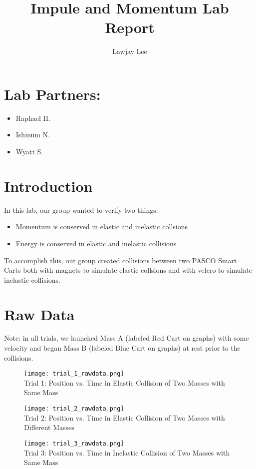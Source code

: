 \documentclass[fleqn]{article}
\title{Impule and Momentum Lab Report}
\author{Lawjay Lee}
\date{}
\begin{document}
\maketitle

\section*{Lab Partners:}
\begin{itemize}
	\item Raphael H.
	\item Ishmum N.
	\item Wyatt S.
\end{itemize}

\section*{Introduction}
In this lab, our group wanted to verify two things:
\begin{itemize}
	\item Momentum is conserved in elastic and inelastic collsions
	\item Energy is conserved in elastic and inelastic collisions
\end{itemize}

To accomplish this, our group created collisions between two PASCO Smart Carts both with magnets to simulate elastic collsions and with velcro to simulate inelastic collisions.

\section*{Raw Data}
Note: in all trials, we launched Mass A (labeled Red Cart on graphs) with some velocity and began Mass B (labeled Blue Cart on graphs) at rest prior to the collisions.
\begin{figure}[H]
	\texttt{[image: trial\_1\_rawdata.png]}
	\\Trial 1: Position vs. Time in Elastic Collision of Two Masses with Same Mass
\end{figure}

\begin{figure}[H]
	\texttt{[image: trial\_2\_rawdata.png]}
	\\Trial 2: Position vs. Time in Elastic Collision of Two Masses with Different Masses
\end{figure}

\begin{figure}[H]
	\texttt{[image: trial\_3\_rawdata.png]}
	\\Trial 3: Position vs. Time in Inelastic Collision of Two Masses with Same Mass
\end{figure}
\end{document}
